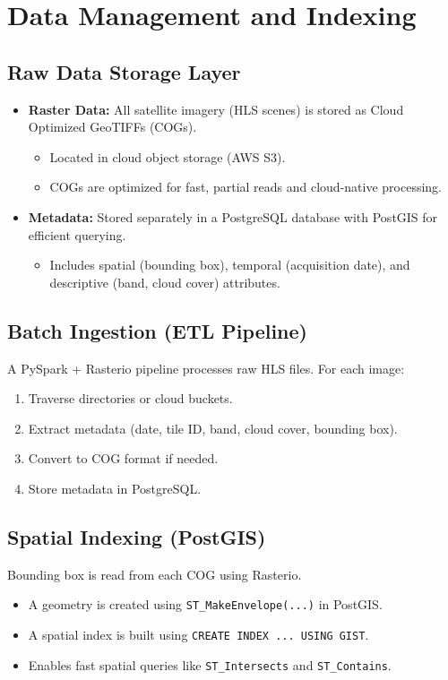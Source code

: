 \section{Data Management and Indexing}

\subsection{Raw Data Storage Layer}
\begin{itemize}
    \item \textbf{Raster Data:} All satellite imagery (HLS scenes) is stored as Cloud Optimized GeoTIFFs (COGs).
    \begin{itemize}
        \item Located in cloud object storage (AWS S3).
        \item COGs are optimized for fast, partial reads and cloud-native processing.
    \end{itemize}
    \item \textbf{Metadata:} Stored separately in a PostgreSQL database with PostGIS for efficient querying.
    \begin{itemize}
        \item Includes spatial (bounding box), temporal (acquisition date), and descriptive (band, cloud cover) attributes.
    \end{itemize}
\end{itemize}

\subsection{Batch Ingestion (ETL Pipeline)}
A PySpark + Rasterio pipeline processes raw HLS files. For each image:
\begin{enumerate}
    \item Traverse directories or cloud buckets.
    \item Extract metadata (date, tile ID, band, cloud cover, bounding box).
    \item Convert to COG format if needed.
    \item Store metadata in PostgreSQL.
\end{enumerate}

\subsection{Spatial Indexing (PostGIS)}
Bounding box is read from each COG using Rasterio.
\begin{itemize}
    \item A geometry is created using \texttt{ST\_MakeEnvelope(...)} in PostGIS.
    \item A spatial index is built using \texttt{CREATE INDEX ... USING GIST}.
    \item Enables fast spatial queries like \texttt{ST\_Intersects} and \texttt{ST\_Contains}.
\end{itemize}

